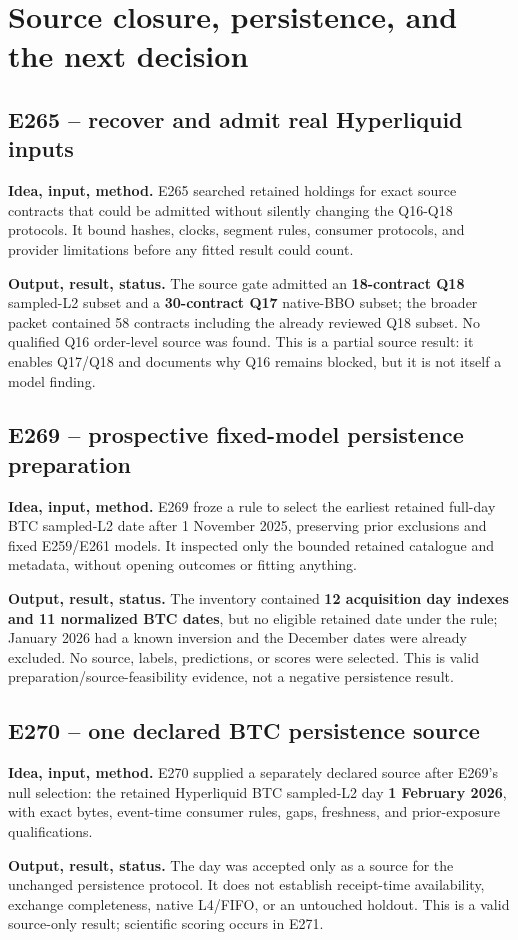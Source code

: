 \documentclass[10pt,a4paper]{article}
\begin{document}
\section{Source closure, persistence, and the next decision}
\subsection{E265 -- recover and admit real Hyperliquid inputs}
\textbf{Idea, input, method.} E265 searched retained holdings for exact source contracts that could be admitted without silently changing the Q16-Q18 protocols. It bound hashes, clocks, segment rules, consumer protocols, and provider limitations before any fitted result could count.\par
\textbf{Output, result, status.} The source gate admitted an \textbf{18-contract Q18} sampled-L2 subset and a \textbf{30-contract Q17} native-BBO subset; the broader packet contained 58 contracts including the already reviewed Q18 subset. No qualified Q16 order-level source was found. This is a partial source result: it enables Q17/Q18 and documents why Q16 remains blocked, but it is not itself a model finding.\par
\subsection{E269 -- prospective fixed-model persistence preparation}
\textbf{Idea, input, method.} E269 froze a rule to select the earliest retained full-day BTC sampled-L2 date after 1 November 2025, preserving prior exclusions and fixed E259/E261 models. It inspected only the bounded retained catalogue and metadata, without opening outcomes or fitting anything.\par
\textbf{Output, result, status.} The inventory contained \textbf{12 acquisition day indexes and 11 normalized BTC dates}, but no eligible retained date under the rule; January 2026 had a known inversion and the December dates were already excluded. No source, labels, predictions, or scores were selected. This is valid preparation/source-feasibility evidence, not a negative persistence result.\par
\subsection{E270 -- one declared BTC persistence source}
\textbf{Idea, input, method.} E270 supplied a separately declared source after E269's null selection: the retained Hyperliquid BTC sampled-L2 day \textbf{1 February 2026}, with exact bytes, event-time consumer rules, gaps, freshness, and prior-exposure qualifications.\par
\textbf{Output, result, status.} The day was accepted only as a source for the unchanged persistence protocol. It does not establish receipt-time availability, exchange completeness, native L4/FIFO, or an untouched holdout. This is a valid source-only result; scientific scoring occurs in E271.\par
\end{document}
